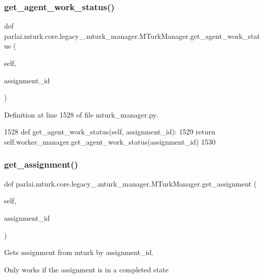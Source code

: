 \subsubsection{\texorpdfstring{get\+\_\+agent\+\_\+work\+\_\+status()}{get\_agent\_work\_status()}}
{\footnotesize\ttfamily def parlai.\+mturk.\+core.\+legacy\+\_.\+mturk\+\_\+manager.\+M\+Turk\+Manager.\+get\+\_\+agent\+\_\+work\+\_\+status (\begin{DoxyParamCaption}\item[{}]{self,  }\item[{}]{assignment\+\_\+id }\end{DoxyParamCaption})}



Definition at line 1528 of file mturk\+\_\+manager.\+py.


\begin{DoxyCode}
1528     \textcolor{keyword}{def }get\_agent\_work\_status(self, assignment\_id):
1529         \textcolor{keywordflow}{return} self.worker\_manager.get\_agent\_work\_status(assignment\_id)
1530 
\end{DoxyCode}
\mbox{\label{classparlai_1_1mturk_1_1core_1_1legacy__2018_1_1mturk__manager_1_1MTurkManager_a256bbe1f481fd2df27e38ce55378a030}} 
\subsubsection{\texorpdfstring{get\+\_\+assignment()}{get\_assignment()}}
{\footnotesize\ttfamily def parlai.\+mturk.\+core.\+legacy\+\_.\+mturk\+\_\+manager.\+M\+Turk\+Manager.\+get\+\_\+assignment (\begin{DoxyParamCaption}\item[{}]{self,  }\item[{}]{assignment\+\_\+id }\end{DoxyParamCaption})}

\begin{DoxyVerb}Gets assignment from mturk by assignment_id.

Only works if the assignment is in a completed state
\end{DoxyVerb}
 

